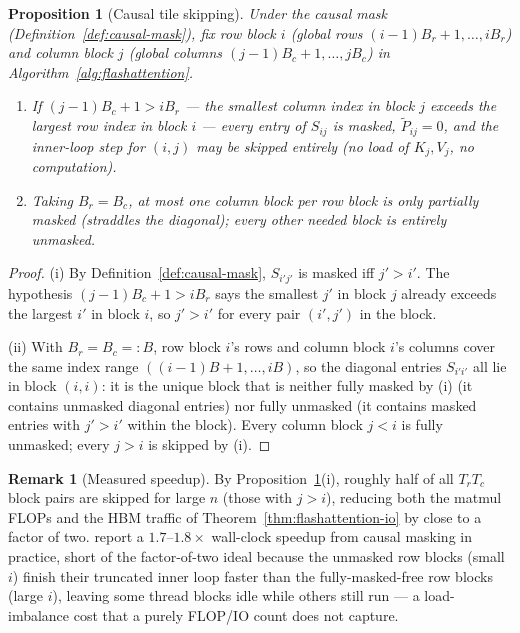 \documentclass[11pt]{amsart}
\theoremstyle{plain}
\newtheorem{proposition}[theorem]{Proposition}
\theoremstyle{definition}
\newtheorem{remark}[theorem]{Remark}
\begin{document}
\begin{proposition}[Causal tile skipping]
\label{prop:causal-tile-skip}
Under the causal mask (Definition~\ref{def:causal-mask}), fix row block $i$
(global rows $(i-1)B_r+1,\ldots,iB_r$) and column block $j$ (global columns
$(j-1)B_c+1,\ldots,jB_c$) in Algorithm~\ref{alg:flashattention}.
\begin{enumerate}[label=(\roman*)]
    \item If $(j-1)B_c + 1 > iB_r$ --- the smallest column index in block $j$
    exceeds the largest row index in block $i$ --- every entry of $S_{ij}$
    is masked, $\tilde{P}_{ij} = 0$, and the inner-loop step for $(i,j)$ may
    be skipped entirely (no load of $K_j,V_j$, no computation).
    \item Taking $B_r = B_c$, at most one column block per row block is
    only \emph{partially} masked (straddles the diagonal); every other
    needed block is entirely unmasked.
\end{enumerate}
\end{proposition}
\begin{proof}
(i) By Definition~\ref{def:causal-mask}, $S_{i'j'}$ is masked iff $j' > i'$.
The hypothesis $(j-1)B_c+1 > iB_r$ says the smallest $j'$ in block $j$
already exceeds the largest $i'$ in block $i$, so $j' > i'$ for every pair
$(i',j')$ in the block.

(ii) With $B_r = B_c =: B$, row block $i$'s rows and column block $i$'s
columns cover the same index range $((i-1)B+1,\ldots,iB)$, so the diagonal
entries $S_{i'i'}$ all lie in block $(i,i)$: it is the unique block that is
neither fully masked by (i) (it contains unmasked diagonal entries) nor
fully unmasked (it contains masked entries with $j'>i'$ within the block).
Every column block $j<i$ is fully unmasked; every $j>i$ is skipped by (i).
\end{proof}

\begin{remark}[Measured speedup]
By Proposition~\ref{prop:causal-tile-skip}(i), roughly half of all $T_rT_c$
block pairs are skipped for large $n$ (those with $j>i$), reducing both the
matmul FLOPs and the HBM traffic of Theorem~\ref{thm:flashattention-io} by
close to a factor of two.  \cite{Dao2023} report a $1.7$--$1.8\times$
wall-clock speedup from causal masking in practice, short of the
factor-of-two ideal because the unmasked row blocks (small $i$) finish their
truncated inner loop faster than the fully-masked-free row blocks (large
$i$), leaving some thread blocks idle while others still run --- a
load-imbalance cost that a purely FLOP/IO count does not capture.
\end{remark}
\end{document}
